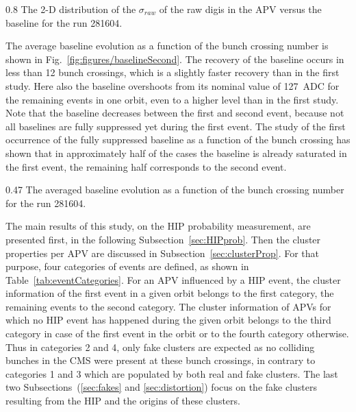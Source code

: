                  {0.8}       %
                 {The 2-D distribution of the $\sigma_{raw}$ of the raw digis in the APV versus the baseline for the run 281604.  } %


The average baseline evolution as a function of the bunch crossing number is shown in Fig.~\ref{fig:figures/baselineSecond}. The recovery of the baseline occurs in less than 12 bunch crossings, which is a slightly faster recovery than in the first study. Here also the baseline overshoots from its nominal value of 127~ADC for the remaining events in one orbit, even to a higher level than in the first study. Note that the baseline decreases between the first and second event, because not all baselines are fully suppressed yet during the first event. The study of the first occurrence of the fully suppressed baseline as a function of the bunch crossing has shown that in approximately half of the cases the baseline is already saturated in the first event, the remaining half corresponds to the second event.

                 {0.47}       %
                 {The averaged baseline evolution as a function of the bunch crossing number for the run 281604. } %
 

The main results of this study, on the HIP probability measurement, are presented first, in the following Subsection~\ref{sec:HIPprob}. Then the cluster properties per APV are discussed in Subsection~\ref{sec:clusterProp}. For that purpose, four categories of events are defined, as shown in Table~\ref{tab:eventCategories}. For an APV influenced by a HIP event, the cluster information of the first event in a given orbit belongs to the first category, the remaining events to the second category. The cluster information of APVs for which no HIP event has happened during the given orbit belongs to the third category in case of the first event in the orbit or to the fourth category otherwise. Thus in categories 2 and 4, only fake clusters are expected as no colliding bunches in the CMS were present at these bunch crossings, in contrary to categories 1 and 3 which are populated by both real and fake clusters. The last two Subsections~(\ref{sec:fakes} and \ref{sec:distortion}) focus on the fake clusters resulting from the HIP and the origins of these clusters. 


